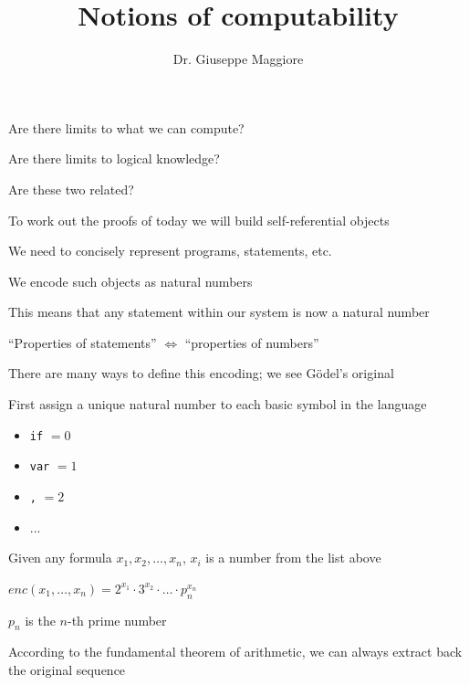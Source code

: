 \documentclass{beamer}
\title{Notions of computability}
\author{Dr. Giuseppe Maggiore}
\institute{Hogeschool Rotterdam \\ 
Rotterdam, Netherlands}
\date{}
\begin{document}
\maketitle

\begin{slide}{
\item Are there limits to what we can compute?
\item Are there limits to logical knowledge?
\item Are these two related?
}\end{slide}

\begin{slide}{
\item To work out the proofs of today we will build self-referential objects
\item We need to concisely represent programs, statements, etc.
\item We encode such objects as natural numbers
}\end{slide}

\begin{slide}{
\item This means that any statement within our system is now a natural number
\item ``Properties of statements'' $\Leftrightarrow$ ``properties of numbers''
\item There are many ways to define this encoding; we see Gödel's original
}\end{slide}

\begin{slide}{
\item First assign a unique natural number to each basic symbol in the language
\begin{itemize}
\item \texttt{if} $=0$
\item \texttt{var} $=1$
\item \texttt{,} $=2$
\item ...
\end{itemize}
}\end{slide}

\begin{slide}{
\item Given any formula $x_1,x_2,\dots,x_n$, $x_i$ is a number from the list above
\item $enc(x_1,\dots,x_n)=2^{x_1} \cdot3^{x_2} \cdot \dots \cdot p_n^{x_n}$
\item $p_n$ is the $n$-th prime number
\item According to the fundamental theorem of arithmetic, we can always extract back the original sequence
}\end{slide}
\end{document}
